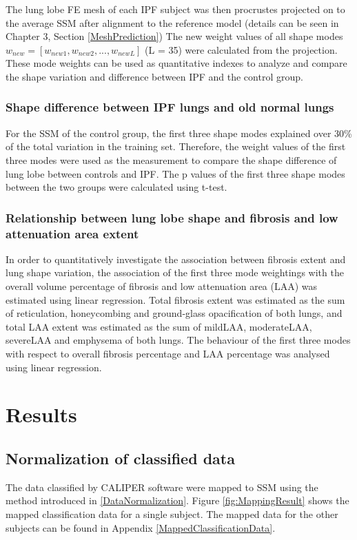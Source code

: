 The lung lobe FE mesh of each IPF subject was then procrustes projected on to the average SSM after alignment to the reference model (details can be seen in Chapter 3, Section \ref{MeshPrediction}) The new weight values of all shape modes $w_{new} = [w_{new1}, w_{new2},...,w_{newL}]$ (L = 35) were calculated from the projection. These mode weights can be used as quantitative indexes to analyze and compare the shape variation and difference between IPF and the control group.

\subsubsection{Shape difference between IPF lungs and old normal lungs}

For the SSM of the control group, the first three shape modes explained over 30\% of the total variation in the training set. Therefore, the weight values of the first three modes were used as the measurement to compare the shape difference of lung lobe between controls and IPF. The p values of the first three shape modes between the two groups were calculated using t-test.

\subsubsection{Relationship between lung lobe shape and fibrosis and low attenuation area extent}
In order to quantitatively investigate the association between fibrosis extent and lung shape variation, the association of the first three mode weightings with the overall volume percentage of fibrosis and low attenuation area (LAA) was estimated using linear regression. Total fibrosis extent was estimated as the sum of reticulation,  honeycombing and ground-glass opacification of both lungs, and total LAA extent was estimated as the sum of mildLAA,  moderateLAA, severeLAA and emphysema of both lungs. The behaviour of the first three modes with respect to overall fibrosis percentage and LAA percentage was analysed using linear regression.

\section{Results}
\subsection{Normalization of classified data}
The data classified by CALIPER software were mapped to SSM using the method introduced in \ref{DataNormalization}. Figure \ref{fig:MappingResult} shows the mapped classification data for a single subject. The mapped data for the other subjects can be found in Appendix \ref{MappedClassificationData}.

